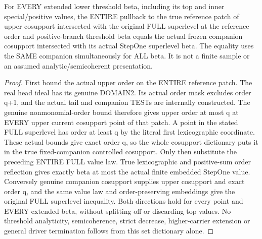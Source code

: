 \begin{theorem}
\label{hir:original-full-cut-frozen-companion-whole-superlevel}
\leanok
For EVERY extended lower threshold beta, including its top and inner
special/positive values, the ENTIRE pullback to the true reference patch
of upper cosupport intersected with the original FULL superlevel at the
reference order and positive-branch threshold beta equals the actual frozen
companion cosupport intersected with its actual StepOne superlevel beta.
The equality uses the SAME companion simultaneously for ALL beta. It is not
a finite sample or an assumed analytic/semicoherent presentation.
\end{theorem}
\begin{proof}
First bound the actual upper order on the ENTIRE reference patch. The real
head ideal has its genuine DOMAIN2. Its actual order mask excludes order
q+1, and the actual tail and companion TESTs are internally constructed.
The genuine nonmonomial-order bound therefore gives upper order at most q
at EVERY upper current cosupport point of that patch. A point in the stated
FULL superlevel has order at least q by the literal first lexicographic
coordinate. These actual bounds give exact order q, so the whole cosupport
dictionary puts it in the true fixed-companion controlled cosupport.
Only then substitute the preceding ENTIRE FULL value law. True lexicographic
and positive-sum order reflection gives exactly beta at most the actual
finite embedded StepOne value. Conversely genuine companion cosupport
supplies upper cosupport and exact order q, and the same value law and
order-preserving embeddings give the original FULL superlevel inequality.
Both directions hold for every point and EVERY extended beta, without
splitting off or discarding top values. No threshold analyticity,
semicoherence, strict decrease, higher-carrier extension or general driver
termination follows from this set dictionary alone.
\end{proof}

